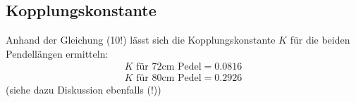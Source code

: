 \subsection{Kopplungskonstante}
Anhand der Gleichung (10!) lässt sich die Kopplungskonstante $K$ für
die beiden Pendellängen ermitteln:
\begin{gather}
    K \textrm{ für 72cm Pedel} = 0.0816\\
    K \textrm{ für 80cm Pedel} = 0.2926
    \label{eqn:kopplung80}
\end{gather}
(siehe dazu Diskussion ebenfalls (!))


